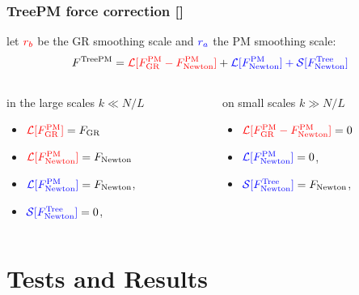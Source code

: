 \documentclass{beamer}
\makeatletter
\newcommand{\mylabel}{%
   [\beamer@againname]}
\makeatother
\begin{document}
\begin{frame}[label=forceaddition2]
    \frametitle{TreePM force correction\mylabel}
let $\color{red} r_b$ be the GR smoothing scale and $\color{blue}r_a$ the PM smoothing scale:
\[
    F^{\text{TreePM}}
    =
    {\color{red} 
       \mathcal{L}[F_{\text{GR}}^{\text{PM}}-F_{\text{Newton}}^{\text{PM}}]
    }
    +{\color{blue}\mathcal{L}[F_{\text{Newton}}^{\text{PM}}]
    +\mathcal{S}[F_{\text{Newton}}^{\text{Tree}}]}
\]
    
    \begin{columns}
    \begin{column}{0.5\textwidth}
        in the large scales $k\ll N/L$
        \begin{itemize}
            \item 
                ${\color{red} \mathcal{L} [ F_{\text{GR}}^{\text{PM}} ] }=F_{\text{GR}}$
            \item
                ${\color{red} \mathcal{L} [ F_{\text{Newton}}^{\text{PM}} ] }=F_{\text{Newton}}$
            \item
            ${\color{blue}\mathcal{L}[F_{\text{Newton}}^{\text{PM}}]}=F_{\text{Newton}}$,
            \item
            ${\color{blue}\mathcal{S}[F_{\text{Newton}}^{\text{Tree}}]}=0$, 
        \end{itemize}
    \end{column}
    \begin{column}{0.5\textwidth}
        on small scales $k\gg N/L$
        \begin{itemize}
            \item 
                ${\color{red} \mathcal{L}[ 
                    F_{\text{GR}}^{\text{PM}} 
                    -F_{\text{Newton}}^{\text{PM}} 
                    ] } = 0$
            \item 
            ${\color{blue}\mathcal{L}[F_{\text{Newton}}^{\text{PM}}]}=0$,
            \item
            ${\color{blue}\mathcal{S}[F_{\text{Newton}}^{\text{Tree}}]}
                =F_{\text{Newton}}$, 
        \end{itemize}
    \end{column}
    \end{columns}
\end{frame}

\section{Tests and Results}
\frame{\sectionpage}
\end{document}
